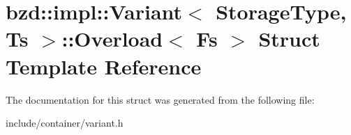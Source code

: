\hypertarget{structbzd_1_1impl_1_1Variant_1_1Overload}{}\section{bzd\+:\+:impl\+:\+:Variant$<$ Storage\+Type, Ts $>$\+:\+:Overload$<$ Fs $>$ Struct Template Reference}
\label{structbzd_1_1impl_1_1Variant_1_1Overload}


The documentation for this struct was generated from the following file\+:\begin{DoxyCompactItemize}
\item 
include/container/variant.\+h\end{DoxyCompactItemize}

